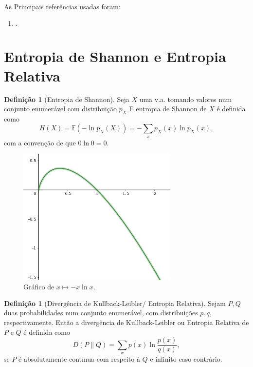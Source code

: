 \documentclass[12pt,a4paper,oneside]{book}
\theoremstyle{definition}
\newtheorem{definition}[theorem]{Defini\c{c}\~ao}
\theoremstyle{remark}
\numberwithin{equation}{section}
\newcommand{\E}{\mathbb{E}}
\begin{document}
\begin{tcolorbox}[colback = white]
As Principais referências usadas foram:
\begin{enumerate}
\item \cite{boucheron2013concentration}.
\end{enumerate}
\end{tcolorbox}

\section{Entropia de Shannon e Entropia Relativa}


\begin{definition}[Entropia de Shannon] Seja $X$ uma v.a. tomando valores num conjunto enumerável com distribuição $p_X$ E entropia de Shannon de $X$ é definida como
$$H(X) = \E(-\ln p_X(X))  = -\sum_{x}p_X(x)\ln p_X(x),$$
com a convenção de que $0\ln 0 = 0.$
\end{definition}

\begin{figure}[h]
\centering %
\includegraphics[width=8cm]{xlnx} %
\caption{Gráfico de $x\mapsto -x\ln x.$}
\end{figure}
 



\begin{definition}[Divergência de Kullback-Leibler/ Entropia Relativa] Sejam $P,Q$ duas probabilidades num conjunto enumerável, com distribuições $p,q$, respectivamente. Então a divergência de Kullback-Leibler ou Entropia Relativa de $P$ e $Q$ é definida como
$$D(P\|Q) = \sum_x p(x)\ln \dfrac{p(x)}{q(x)},$$
se $P$ é absolutamente contínua com respeito à $Q$ e infinito caso contrário. 
\end{definition}
\end{document}
